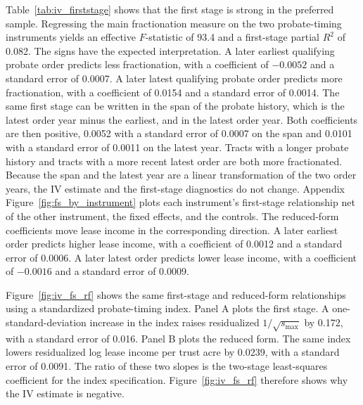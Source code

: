 \documentclass[12pt]{article}
\begin{document}
Table~\ref{tab:iv_firststage} shows that the first stage is strong in the preferred sample. Regressing the main fractionation measure on the two probate-timing instruments yields an effective $F$-statistic of 93.4 and a first-stage partial $R^2$ of 0.082. The signs have the expected interpretation. A later earliest qualifying probate order predicts less fractionation, with a coefficient of $-0.0052$ and a standard error of 0.0007. A later latest qualifying probate order predicts more fractionation, with a coefficient of 0.0154 and a standard error of 0.0014. The same first stage can be written in the span of the probate history, which is the latest order year minus the earliest, and in the latest order year. Both coefficients are then positive, 0.0052 with a standard error of 0.0007 on the span and 0.0101 with a standard error of 0.0011 on the latest year. Tracts with a longer probate history and tracts with a more recent latest order are both more fractionated. Because the span and the latest year are a linear transformation of the two order years, the IV estimate and the first-stage diagnostics do not change. Appendix Figure~\ref{fig:fs_by_instrument} plots each instrument's first-stage relationship net of the other instrument, the fixed effects, and the controls. The reduced-form coefficients move lease income in the corresponding direction. A later earliest order predicts higher lease income, with a coefficient of 0.0012 and a standard error of 0.0006. A later latest order predicts lower lease income, with a coefficient of $-0.0016$ and a standard error of 0.0009.

Figure~\ref{fig:iv_fs_rf} shows the same first-stage and reduced-form relationships using a standardized probate-timing index. Panel A plots the first stage. A one-standard-deviation increase in the index raises residualized $1/\sqrt{s_{\max}}$ by 0.172, with a standard error of 0.016. Panel B plots the reduced form. The same index lowers residualized log lease income per trust acre by 0.0239, with a standard error of 0.0091. The ratio of these two slopes is the two-stage least-squares coefficient for the index specification. Figure~\ref{fig:iv_fs_rf} therefore shows why the IV estimate is negative.
\end{document}
